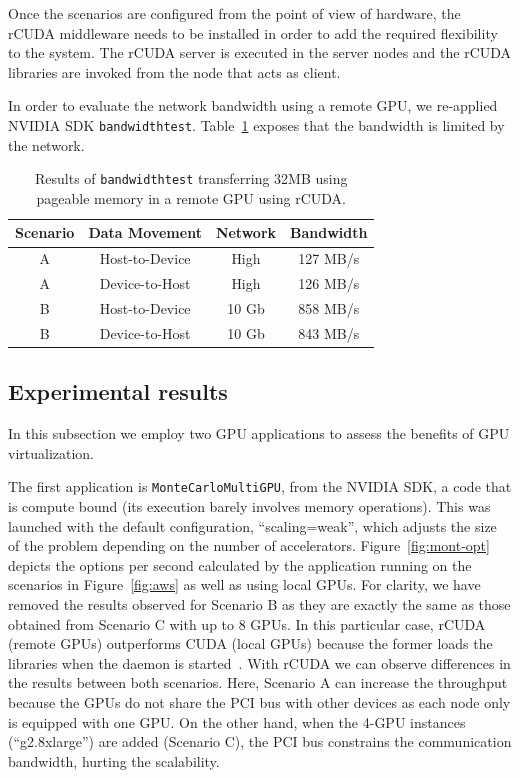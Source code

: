 \documentclass[a4paper,twoside]{article}
\begin{document}
Once the scenarios are configured from the point of view of hardware, 
the {rCUDA} middleware needs to be installed in order to add 
the required flexibility to the system. The {rCUDA} server is 
executed in the server nodes and the {rCUDA} libraries are invoked from the node that acts as client.

In order to evaluate the network bandwidth using a remote GPU, we re-applied NVIDIA SDK {\tt bandwidthtest}.
Table~\ref{table:bwtrcuda} exposes that the bandwidth is limited by the network.

\begin{table}[htb]
\renewcommand{\arraystretch}{1.3}
\caption{Results of {\tt bandwidthtest} transferring 32MB using pageable memory in a remote GPU using {rCUDA}.}
\label{table:bwtrcuda}
\tabcolsep=0.09cm
\begin{center}\begin{tabular}{cccc}
Scenario &  Data Movement & Network & Bandwidth \\ \hline \hline
A & Host-to-Device & High& 127 MB/s \\ \hline
A & Device-to-Host & High& 126 MB/s\\ \hline
B & Host-to-Device & 10 Gb& 858 MB/s\\ \hline
B & Device-to-Host & 10 Gb& 843 MB/s\\ \hline
\end{tabular}\end{center}\end{table}

\subsection{Experimental results}
In this subsection we employ two GPU applications to assess the benefits of GPU virtualization.

The first application is {\tt MonteCarloMultiGPU}, from the NVIDIA SDK, a code that is compute bound (its execution barely involves memory operations). 
This was launched with the default configuration, ``scaling=weak'', which adjusts the size of the problem depending on the number of accelerators.
Figure~\ref{fig:mont-opt} depicts the options per second calculated by the application running on the scenarios in Figure~\ref{fig:aws} as well as using local GPUs. 
For clarity, we have removed the results observed for Scenario B as they are exactly the same as those obtained from Scenario C with up to 8 GPUs. 
In this particular case, rCUDA (remote GPUs) outperforms CUDA (local GPUs) because the former loads the libraries when the daemon is started~\cite{tonithesis}.
With rCUDA we can observe differences in the results between both scenarios. 
Here, Scenario A can increase the throughput because the GPUs do not share the PCI bus with other devices as each node only is equipped with one GPU.
On the other hand, when the 4-GPU instances (``g2.8xlarge'') are added (Scenario C), the PCI bus constrains the communication bandwidth, hurting the scalability.
\end{document}

